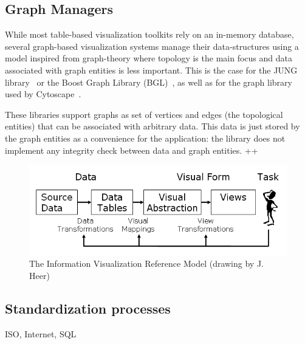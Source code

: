 \subsection{Graph Managers}

While most table-based visualization toolkits rely on an in-memory
database, several graph-based visualization systems manage their
data-structures using a model inspired from graph-theory where
topology is the main focus and data associated with graph entities is
less important.  This is the case for the JUNG library~\cite{jung2003}
or the Boost Graph Library (BGL)~\cite{BGL}, as well as for the graph
library used by Cytoscape~\cite{Cytoscape}.

These libraries support graphs as set of vertices and edges (the
topological entities) that can be associated with arbitrary data.
This data is just stored by the graph entities as a convenience for
the application: the library does not implement any integrity check
between data and graph entities. ++


\begin{figure}
\includegraphics[width=\columnwidth]{figures/reference_model}
\caption{The Information Visualization Reference Model (drawing by
  J. Heer)}
\label{fig:refmodel}
\end{figure}


\subsection{Standardization processes}
ISO, Internet, SQL





